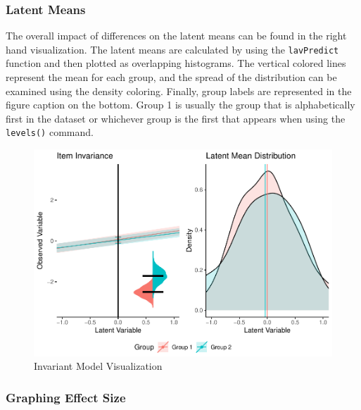 \documentclass[
  man]{apa6}
\begin{document}
\hypertarget{latent-means}{%
\subsubsection{Latent Means}\label{latent-means}}

The overall impact of differences on the latent means can be found in the right hand visualization. The latent means are calculated by using the \texttt{lavPredict} function and then plotted as overlapping histograms. The vertical colored lines represent the mean for each group, and the spread of the distribution can be examined using the density coloring. Finally, group labels are represented in the figure caption on the bottom. Group 1 is usually the group that is alphabetically first in the dataset or whichever group is the first that appears when using the \texttt{levels()} command.

\begin{figure}
\centering
\includegraphics{manuscript_files/figure-latex/invariant-pic-1.pdf}
\caption{\label{fig:invariant-pic}Invariant Model Visualization}
\end{figure}

\hypertarget{graphing-effect-size}{%
\subsubsection{Graphing Effect Size}\label{graphing-effect-size}}
\end{document}
